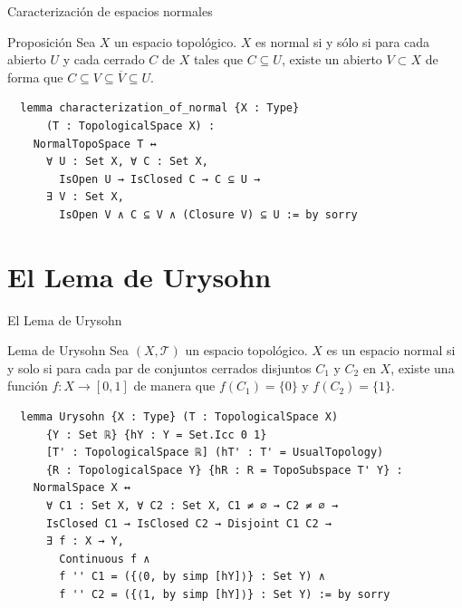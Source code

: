 \documentclass{beamer}
\begin{document}
\begin{frame}[fragile]{Caracterización de espacios normales}
  
  \begin{block}{Proposición}
    Sea $X$ un espacio topológico. $X$ es normal si y sólo si para cada abierto $U$ y cada cerrado $C$ de $X$ tales que $C \subseteq U$, existe un abierto $V \subset X$ de forma que $C \subseteq V \subseteq \overline{V} \subseteq U$.
  \end{block}

  \begin{lstlisting}
  lemma characterization_of_normal {X : Type}
      (T : TopologicalSpace X) :
    NormalTopoSpace T ↔
      ∀ U : Set X, ∀ C : Set X,
        IsOpen U → IsClosed C → C ⊆ U →
      ∃ V : Set X,
        IsOpen V ∧ C ⊆ V ∧ (Closure V) ⊆ U := by sorry \end{lstlisting}

\end{frame}

\section{El Lema de Urysohn}

\begin{frame}[fragile]{El Lema de Urysohn}

  \begin{block}{Lema de Urysohn}
    Sea $(X, \mathcal{T})$ un espacio topológico. $X$ es un espacio normal si y solo si para cada par de conjuntos cerrados disjuntos $C_1$ y $C_2$ en $X$, existe una función $f : X \to [0, 1]$ de manera que $f(C_1) = \{0\}$ y $f(C_2) = \{1\}$.
  \end{block}

  \begin{lstlisting}
  lemma Urysohn {X : Type} (T : TopologicalSpace X)
      {Y : Set ℝ} {hY : Y = Set.Icc 0 1}
      [T' : TopologicalSpace ℝ] (hT' : T' = UsualTopology)
      {R : TopologicalSpace Y} {hR : R = TopoSubspace T' Y} :
    NormalSpace X ↔
      ∀ C1 : Set X, ∀ C2 : Set X, C1 ≠ ∅ → C2 ≠ ∅ →
      IsClosed C1 → IsClosed C2 → Disjoint C1 C2 →
      ∃ f : X → Y,
        Continuous f ∧
        f '' C1 = ({⟨0, by simp [hY]⟩} : Set Y) ∧
        f '' C2 = ({⟨1, by simp [hY]⟩} : Set Y) := by sorry \end{lstlisting}
  
\end{frame}
\end{document}
